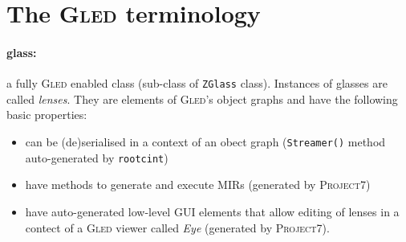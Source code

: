 \documentclass[a4paper,11pt]{article}
\def\gled{\textsc{Gled}\xspace}
\def\p7{\textsc{Project7}\xspace}
\begin{document}

\appendix

\section{The \gled terminology}
\label{app:gled-terminology}

\paragraph{glass:} a fully \gled enabled class (sub-class of
\texttt{ZGlass} class). Instances of glasses are called \emph{lenses}.
They are elements of \gled's object graphs and have the following
basic properties:
\begin{itemize}\parsep=0pt\itemsep=0pt
\item can be (de)serialised in a context of an obect graph
  (\texttt{Streamer()} method auto-generated by \texttt{rootcint})
\item have methods to generate and execute MIRs (generated by \p7)
\item have auto-generated low-level GUI elements that allow editing of
  lenses in a contect of a \gled viewer called \emph{Eye} (generated
  by \p7).
\end{itemize}
\end{document}

